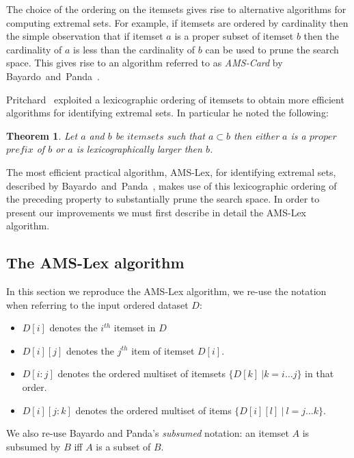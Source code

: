 \documentclass[13pt,a4paper]{article}
\newtheorem{theorem}{Theorem}[section]
\begin{document}
The choice of the ordering on the itemsets gives rise to alternative algorithms for computing extremal sets. For example, if itemsets are ordered by cardinality then the simple observation that if itemset $a$ is a proper subset of itemset $b$ then the cardinality of $a$ is less than the cardinality of $b$ can be used to prune the search space. This gives rise to an algorithm referred to as \textit{AMS-Card} by Bayardo~and~Panda~\cite{BayardoPanda11}.

Pritchard~\cite{Pritchard97} exploited a lexicographic ordering of itemsets to obtain more efficient algorithms for identifying extremal sets. In particular he noted the following:

\begin{theorem}
\label{th:lex}
Let $a$ and $b$ be $itemsets$ such that $a \subset b$ then either $a$ is a $proper$ $prefix$ of $b$ or $a$ is lexicographically larger then $b$.
\end{theorem}

The most efficient practical algorithm, AMS-Lex, for identifying extremal sets, described by Bayardo~and~Panda~\cite{BayardoPanda11}, makes use of this lexicographic ordering of the preceding property to substantially prune the search space. In order to present our improvements we must first describe in detail the AMS-Lex algorithm.





\subsection{The AMS-Lex algorithm}
\label{sec:background:ams-lex}

In this section we reproduce the AMS-Lex algorithm, we re-use the notation \cite{BayardoPanda11} when referring to the input ordered dataset $D$:

\begin{itemize}
    \item $D[i]$ denotes the $i^{th}$ itemset in $D$
    \item $D[i][j]$ denotes the $j^{th}$ item of itemset $D[i]$.
    \item $D[i : j]$ denotes the ordered multiset of itemsets $\lbrace D[k] ~| k = i \ldots j \rbrace$ in that order.
    \item $D[i][j : k]$ denotes the ordered multiset of items $\lbrace D[i][l] ~|~ l = j \ldots k \rbrace$.
\end{itemize}

We also re-use Bayardo and Panda's \textit{subsumed} notation: an itemset $A$ is subsumed by $B$ iff $A$ is a subset of $B$.
\end{document}
